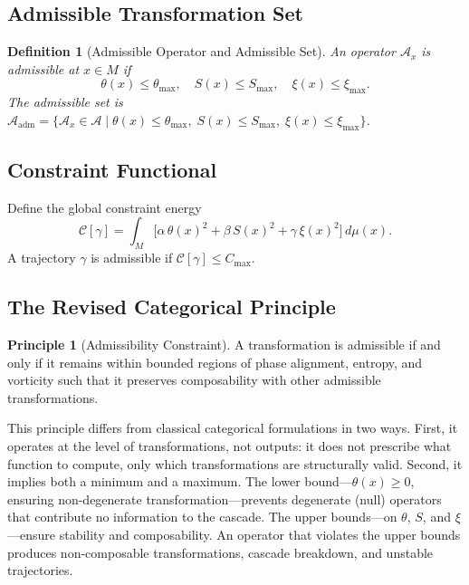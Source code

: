 \documentclass[12pt, a4paper]{article}
\newtheorem{definition}[theorem]{Definition}
\theoremstyle{remark}
\theoremstyle{definition}
\newtheorem{principle}[theorem]{Principle}
\begin{document}
\subsection{Admissible Transformation Set}

\begin{definition}[Admissible Operator and Admissible Set]
An operator $\mathcal{A}_x$ is \emph{admissible} at $x \in M$ if
\[
\theta(x) \le \theta_{\max}, \quad
S(x) \le S_{\max}, \quad
\xi(x) \le \xi_{\max}.
\]
The admissible set is
$\mathcal{A}_{\mathrm{adm}} = \{\mathcal{A}_x \in \mathcal{A} \mid \theta(x) \le
\theta_{\max},\; S(x) \le S_{\max},\; \xi(x) \le \xi_{\max}\}$.
\end{definition}

\subsection{Constraint Functional}

Define the global constraint energy
\[
\mathcal{C}[\gamma]
= \int_M \bigl[\alpha\,\theta(x)^2 + \beta\,S(x)^2 + \gamma\,\xi(x)^2\bigr]\,d\mu(x).
\]
A trajectory $\gamma$ is admissible if $\mathcal{C}[\gamma] \le C_{\max}$.

\subsection{The Revised Categorical Principle}

\begin{principle}[Admissibility Constraint]
A transformation is admissible if and only if it remains within bounded regions of phase
alignment, entropy, and vorticity such that it preserves composability with other admissible
transformations.
\end{principle}

This principle differs from classical categorical formulations in two ways.  First, it
operates at the level of transformations, not outputs: it does not prescribe what function
to compute, only which transformations are structurally valid.  Second, it implies both a
minimum and a maximum.  The lower bound---$\theta(x) \ge 0$, ensuring non-degenerate
transformation---prevents degenerate (null) operators that contribute no information to
the cascade.  The upper bounds---on $\theta$, $S$, and $\xi$---ensure stability and
composability.  An operator that violates the upper bounds produces non-composable
transformations, cascade breakdown, and unstable trajectories.
\end{document}
